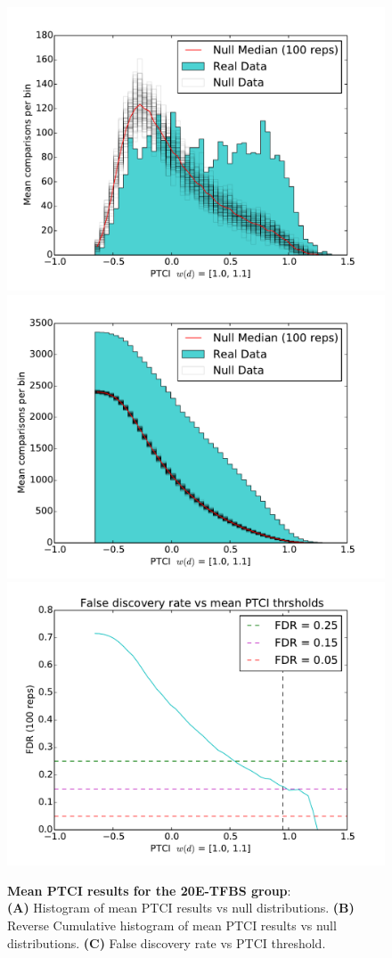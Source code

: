 
\begin{figure}[hp]
%
\subcaptionbox{\label{fig:ecr-mean-ptci-hists-base}}
{\includegraphics[width=.5\linewidth]{figures/figs/ecr_team_ptci_20130918_orthodb7/mean_ptci_hist.pdf}}
% 
\subcaptionbox{\label{fig:ecr-mean-ptci-hists-rcum-hist}}
{\includegraphics[width=.5\linewidth]{figures/figs/ecr_team_ptci_20130918_orthodb7/mean_ptci_cum_hist.pdf}}
% 
\subcaptionbox{\label{fig:ecr-mean-ptci-hists-fdr}}
{\includegraphics[width=.5\linewidth]{figures/figs/ecr_team_ptci_20130918_orthodb7/mean_ptci_fdr.pdf}}
% 
% 
\caption[Mean 20E-PTCI results]{\sf \textbf{Mean PTCI results for the \gls{20E}-\gls{TFBS} group}:\\
\textbf{(A)} Histogram of mean PTCI results vs null distributions.
\textbf{(B)} Reverse Cumulative histogram of mean PTCI results vs null distributions.
\textbf{(C)} False discovery rate vs PTCI threshold.}
\label{fig:ecr-mean-ptci-hists}
\end{figure}